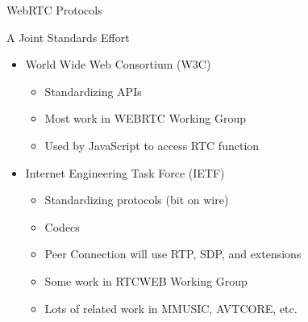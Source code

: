 \begin{frame}{WebRTC Protocols}
\end{frame}

\begin{frame}{A Joint Standards Effort}
\begin{itemize}
\item World Wide Web Consortium (W3C)
\begin{itemize}
\item Standardizing APIs
\item Most work in WEBRTC Working Group
\item Used by JavaScript to access RTC function
\end{itemize}
\item Internet Engineering Task Force (IETF)
\begin{itemize}
\item Standardizing protocols (bit on wire)
\item Codecs 
\item Peer Connection will use RTP, SDP, and extensions
\item Some work in RTCWEB Working Group
\item Lots of related work in MMUSIC, AVTCORE, etc.
\end{itemize}
\end{itemize}
\end{frame}


